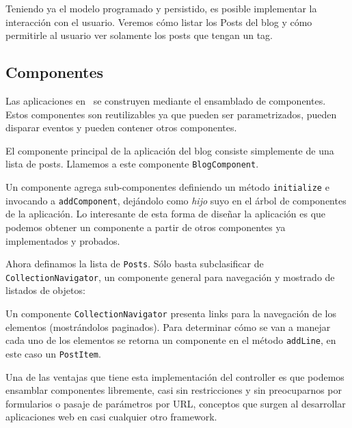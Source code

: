 Teniendo ya el modelo programado y persistido, es posible implementar la interacción con el usuario. Veremos cómo listar los Posts del blog y cómo permitirle al usuario ver solamente los posts que tengan un tag.

\subsection{Componentes}
\label{sub-comp}

Las aplicaciones en \PWB\ se construyen mediante el ensamblado de componentes. Estos componentes son reutilizables ya que pueden ser parametrizados, pueden disparar eventos y pueden contener otros componentes.

El componente principal de la aplicación del blog consiste simplemente de una lista de posts. Llamemos a este componente \verb"BlogComponent".


Un componente agrega sub-componentes definiendo un método \verb"initialize" e invocando a \verb"addComponent", dejándolo como \emph{hijo} suyo en el árbol de componentes de la aplicación. Lo interesante de esta forma de diseñar la aplicación es que podemos obtener un componente a partir de otros componentes ya implementados y probados.


Ahora definamos la lista de \verb"Posts". Sólo basta subclasificar de \verb"CollectionNavigator", un componente general para navegación y mostrado de listados de objetos:


Un componente \verb"CollectionNavigator" presenta links para la navegación de los elementos (mostrándolos paginados). Para determinar cómo se van a manejar cada uno de los elementos se retorna un componente en el método \verb"addLine", en este caso un \verb'PostItem'.

Una de las ventajas que tiene esta implementación del controller es que podemos ensamblar componentes libremente, casi sin restricciones y sin preocuparnos por formularios o pasaje de parámetros por URL, conceptos que surgen al desarrollar aplicaciones web en casi cualquier otro framework.

